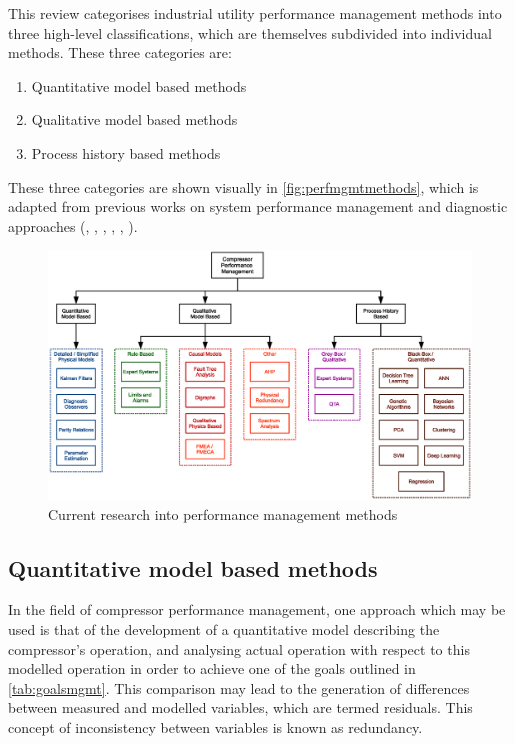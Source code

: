 This review categorises industrial utility performance management methods into three high-level classifications, which are themselves subdivided into individual methods. These three categories are:
\begin{enumerate}
\item Quantitative model based methods
\item Qualitative model based methods
\item Process history based methods
\end{enumerate}
These three categories are shown visually in \autoref{fig:perfmgmtmethods}, which is adapted from previous works on system performance management and diagnostic approaches (\cite{Katipamula2005}, \cite{Venkatasubramanian2003}, \cite{Venkatasubramanian2003a}, \cite{Venkatasubramanian2003b}, \cite{Gao2015}, \cite{Gao2015a}).


\begin{figure}
\includegraphics[width=\textwidth]{./Images/perfmgmt.eps}
\caption{Current research into performance management methods}
\label{fig:perfmgmtmethods}
\end{figure}

\subsection{Quantitative model based methods}
In the field of compressor performance management, one approach which may be used is that of the development of a quantitative model describing the compressor’s operation, and analysing actual operation with respect to this modelled operation in order to achieve one of the goals outlined in \autoref{tab:goalsmgmt}. This comparison may lead to the generation of differences between measured and modelled variables, which are termed residuals. This concept of inconsistency between variables is known as redundancy.

